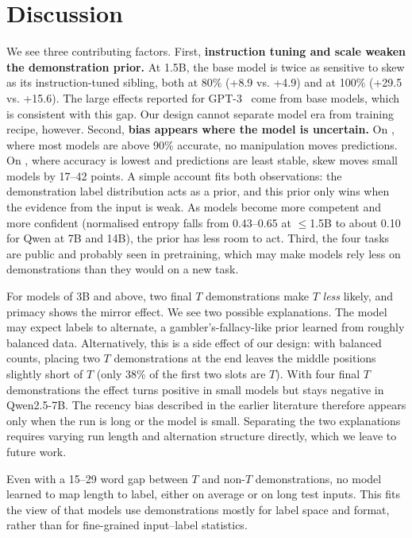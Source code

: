\section{Discussion}
\label{sec:discussion}

 We see three contributing factors. First, {\bf instruction tuning and scale weaken the demonstration prior.} At 1.5B, the base model is twice as sensitive to skew as its instruction-tuned sibling, both at 80\% (+8.9 vs. +4.9) and at 100\% (+29.5 vs. +15.6). The large effects reported for GPT-3~\citep{zhao2021calibrate} come from base models, which is consistent with this gap. Our design cannot separate model era from training recipe, however. Second, {\bf bias appears where the model is uncertain.} On \sst, where most models are above 90\% accurate, no manipulation moves predictions. On \mrpc, where accuracy is lowest and predictions are least stable, skew moves small models by 17--42 points. A simple account fits both observations: the demonstration label distribution acts as a prior, and this prior only wins when the evidence from the input is weak. As models become more competent and more confident (normalised entropy falls from 0.43--0.65 at $\le$1.5B to about 0.10 for Qwen at 7B and 14B), the prior has less room to act. Third, the four tasks are public and probably seen in pretraining, which may make models rely less on demonstrations than they would on a new task.

 For models of 3B and above, two final $T$ demonstrations make $T$ \emph{less} likely, and primacy shows the mirror effect. We see two possible explanations. The model may expect labels to alternate, a gambler's-fallacy-like prior learned from roughly balanced data. Alternatively, this is a side effect of our design: with balanced counts, placing two $T$ demonstrations at the end leaves the middle positions slightly short of $T$ (only 38\% of the first two slots are $T$). With four final $T$ demonstrations the effect turns positive in small models but stays negative in Qwen2.5-7B. The recency bias described in the earlier literature therefore appears only when the run is long or the model is small. Separating the two explanations requires varying run length and alternation structure directly, which we leave to future work.

 Even with a 15--29 word gap between $T$ and non-$T$ demonstrations, no model learned to map length to label, either on average or on long test inputs. This fits the view of \citet{min2022rethinking} that models use demonstrations mostly for label space and format, rather than for fine-grained input--label statistics.

